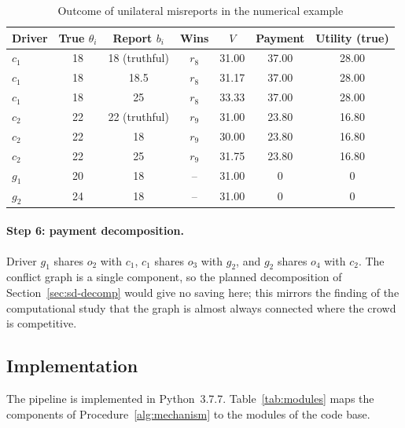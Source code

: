 \begin{table}[t]
\centering
\caption{Outcome of unilateral misreports in the numerical example}
\label{tab:ex-dsic}
\small
\begin{tabular}{lcccccc}
\toprule
Driver & True $\theta_i$ & Report $b_i$ & Wins & $V$ & Payment & Utility (true)\\
\midrule
$c_1$ & 18 & 18 (truthful) & $r_8$ & 31.00 & 37.00 & 28.00\\
$c_1$ & 18 & 18.5 & $r_8$ & 31.17 & 37.00 & 28.00\\
$c_1$ & 18 & 25 & $r_8$ & 33.33 & 37.00 & 28.00\\
$c_2$ & 22 & 22 (truthful) & $r_9$ & 31.00 & 23.80 & 16.80\\
$c_2$ & 22 & 18 & $r_9$ & 30.00 & 23.80 & 16.80\\
$c_2$ & 22 & 25 & $r_9$ & 31.75 & 23.80 & 16.80\\
$g_1$ & 20 & 18 & -- & 31.00 & 0 & 0\\
$g_2$ & 24 & 18 & -- & 31.00 & 0 & 0\\
\bottomrule
\end{tabular}
\end{table}

\paragraph{Step 6: payment decomposition.} Driver $g_1$ shares $o_2$ with
$c_1$, $c_1$ shares $o_3$ with $g_2$, and $g_2$ shares $o_4$ with $c_2$. The
conflict graph is a single component, so the planned decomposition of
Section~\ref{sec:sd-decomp} would give no saving here; this mirrors the finding of the computational study that the
graph is almost always connected where the crowd is competitive.

\subsection{Implementation}
\label{sec:sd-impl}

The pipeline is implemented in Python~3.7.7. Table~\ref{tab:modules} maps the
components of Procedure~\ref{alg:mechanism} to the modules of the code base.

